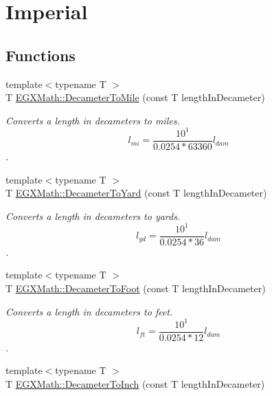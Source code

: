 \hypertarget{group___e_g_x_math-_conversions-_length_conversions-_s_i-_decameter-_imperial}{}\section{Imperial}
\label{group___e_g_x_math-_conversions-_length_conversions-_s_i-_decameter-_imperial}
\subsection*{Functions}
\begin{DoxyCompactItemize}
\item 
{\footnotesize template$<$typename T $>$ }\\T \mbox{\hyperlink{group___e_g_x_math-_conversions-_length_conversions-_s_i-_decameter-_imperial_gac2a54223d869e01fc7a9c73fbf3f2906}{E\+G\+X\+Math\+::\+Decameter\+To\+Mile}} (const T length\+In\+Decameter)
\begin{DoxyCompactList}\small\item\em Converts a length in decameters to miles. \[ l_{mi}=\frac{10^{1}}{0.0254 * 63360} l_{dam} \]. \end{DoxyCompactList}\item 
{\footnotesize template$<$typename T $>$ }\\T \mbox{\hyperlink{group___e_g_x_math-_conversions-_length_conversions-_s_i-_decameter-_imperial_ga42a81b14a91ba9ddb4967faa55b6a3a0}{E\+G\+X\+Math\+::\+Decameter\+To\+Yard}} (const T length\+In\+Decameter)
\begin{DoxyCompactList}\small\item\em Converts a length in decameters to yards. \[ l_{yd}= \frac{10^{1}}{0.0254 * 36} l_{dam} \]. \end{DoxyCompactList}\item 
{\footnotesize template$<$typename T $>$ }\\T \mbox{\hyperlink{group___e_g_x_math-_conversions-_length_conversions-_s_i-_decameter-_imperial_gad2829e03e1755db4f7f9b21070ecaef6}{E\+G\+X\+Math\+::\+Decameter\+To\+Foot}} (const T length\+In\+Decameter)
\begin{DoxyCompactList}\small\item\em Converts a length in decameters to feet. \[ l_{ft}= \frac{10^{1}}{0.0254 * 12} l_{dam} \]. \end{DoxyCompactList}\item 
{\footnotesize template$<$typename T $>$ }\\T \mbox{\hyperlink{group___e_g_x_math-_conversions-_length_conversions-_s_i-_decameter-_imperial_ga246ab50e821640008d965b5690226df5}{E\+G\+X\+Math\+::\+Decameter\+To\+Inch}} (const T length\+In\+Decameter)

\end{DoxyCompactItemize}
